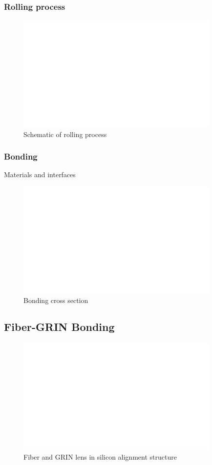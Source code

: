 \subsubsection{Rolling process}
\begin{figure}[h!]\centering \includegraphics[width=10cm,draft]{figures/foo.png}
      \caption{Schematic of rolling process}
\end{figure}

\subsubsection{Bonding}
Materials and interfaces
\begin{figure}[h!]\centering \includegraphics[width=10cm,draft]{figures/foo.png}
      \caption{Bonding cross section}
\end{figure}

\clearpage
\subsection{Fiber-GRIN Bonding}


\begin{figure}[h!]\centering \includegraphics[width=10cm,draft]{figures/foo.png}
      \caption{Fiber and GRIN lens in silicon alignment structure}
\end{figure}

